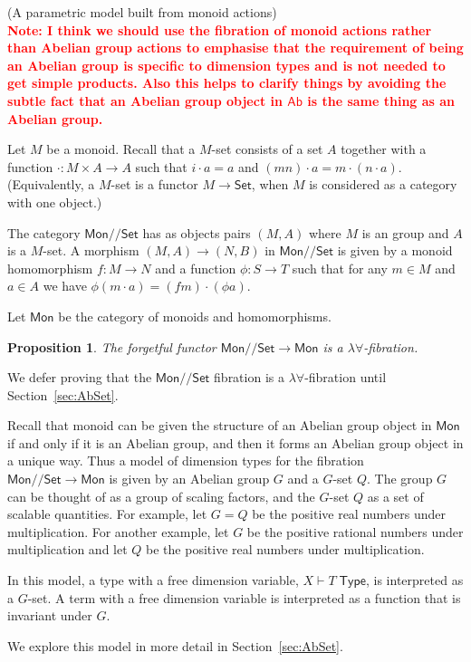 \documentclass[a4paper,UKenglish]{lipics}
\newtheorem{proposition}[theorem]{Proposition}
\newcommand\note[1]{{ \bf \textcolor{red} {\vspace{2mm}\; \\ Note: #1\\}}}
\newcommand{\msf}[1]{\mathsf{#1}} %
\newcommand{\Mon}{\msf{Mon}}
\newcommand{\Ab}{\msf{Ab}}
\newcommand{\Set}{\msf{Set}}
\newcommand{\GroupSet}[1]{#1/\!/\Set}
\newcommand{\MonSet}{\GroupSet{\Mon}}
\newcommand{\Tj}[2]{#1 \vdash #2 \; \msf{ Type}}
\newcommand{\Dvar}{X}
\begin{document}
\begin{example}(A parametric model built from monoid actions)
\note{I think we should use the fibration of monoid actions rather than Abelian group actions to emphasise that the requirement of being an Abelian group is specific to dimension types and is not needed to get simple products. Also this helps to clarify things by avoiding the subtle fact that an Abelian group object in $\Ab$ is the same thing as an Abelian group.}
\begin{definition}
Let $M$ be a monoid. Recall that a $M$-set consists of a
set $A$ together with a function $\cdot:M\times A\to A$ such that
$i\cdot a=a$ and $(mn)\cdot a=m\cdot (n\cdot a)$.
(Equivalently, a $M$-set is a functor $M\to\Set$, when $M$ is considered
as a category with one object.)

The category $\MonSet$ has as objects pairs $(M,A)$ where $M$ is an
group and $A$ is a $M$-set. A morphism $(M,A) \rightarrow
(N,B)$ in $\MonSet$ is given by a monoid homomorphism $f:M\rightarrow N$
and a function $\phi:S \rightarrow T$ such that for any
 $m\in M$ and $a\in A$ we have
$\phi (m\cdot a) = (f m)\cdot (\phi a)$.
\end{definition}

Let $\Mon$ be the category of monoids and homomorphisms.
\begin{proposition}
The forgetful functor $\MonSet\to \Mon$ is a $\lambda\forall$-fibration.
\end{proposition}
We defer proving that the $\MonSet$ fibration is a $\lambda\forall$-fibration
until Section~\ref{sec:AbSet}.

Recall that monoid can be given the structure of an
Abelian group object in $\Mon$ if and only if it is an Abelian group,
and then it forms an Abelian group object in a unique way.
Thus a model of dimension types
for the fibration $\MonSet\to\Mon$ is given by
an Abelian group $G$ and a $G$-set $Q$.
The group $G$ can be thought of as a group of scaling factors,
and the $G$-set $Q$ as a set of scalable quantities.
For example, let $G=Q$ be the positive real numbers under multiplication.
For another example,
let $G$ be the positive rational numbers under multiplication and let
$Q$ be the positive real numbers under multiplication.

In this model, a type with a free dimension variable,
$\Tj\Dvar T$, is interpreted as a $G$-set.
A term with a free dimension variable is interpreted as a
function that is invariant under $G$.

We explore this model in more detail in Section~\ref{sec:AbSet}.
\end{example}
\end{document}

